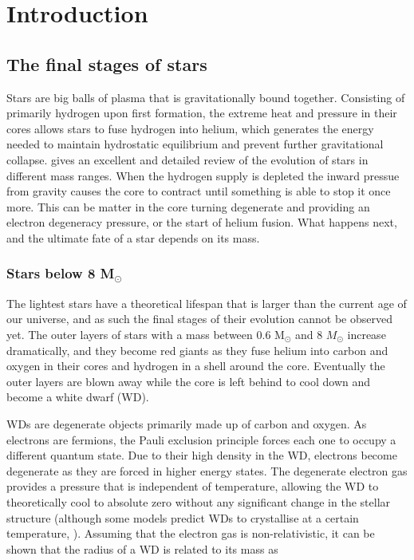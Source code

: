 \documentclass[a4paper,oneside,12pt, class=Latex/Classes/PhDthesisPSnPDF, crop=false]{standalone}
\begin{document}
\doublespacing
\chapter{Introduction}
\label{chap:intro}

\section{The final stages of stars}
Stars are big balls of plasma that is gravitationally bound together. Consisting of primarily hydrogen upon first formation, the extreme heat and pressure in their cores allows stars to fuse hydrogen into helium, which generates the energy needed to maintain hydrostatic equilibrium and prevent further gravitational collapse. \citet{starstruct} gives an excellent and detailed review of the evolution of stars in different mass ranges. When the hydrogen supply is depleted the inward pressue from gravity causes the core to contract until something is able to stop it once more. This can be matter in the core turning degenerate and providing an electron degeneracy pressure, or the start of helium fusion. What happens next, and the ultimate fate of a star depends on its mass.


\subsection{Stars below 8 M$_\odot$}
\label{interm_mass_stars}
The lightest stars have a theoretical lifespan that is larger than the current age of our universe, and as such the final stages of their evolution cannot be observed yet. The outer layers of stars with a mass between 0.6 M$_\odot$ and 8 $M_\odot$ increase dramatically, and they become red giants as they fuse helium into carbon and oxygen in their cores and hydrogen in a shell around the core. Eventually the outer layers are blown away while the core is left behind to cool down and become a white dwarf (WD).

WDs are degenerate objects primarily made up of carbon and oxygen. As electrons are fermions, the Pauli exclusion principle \citep{Pauli} forces each one to occupy a different quantum state. Due to their high density in the WD, electrons become degenerate as they are forced in higher energy states. The degenerate electron gas provides a pressure that is independent of temperature, allowing the WD to theoretically cool to absolute zero without any significant change in the stellar structure (although some models predict WDs to crystallise at a certain temperature, \citealt{WD_crystal_Mochkovitch, WD_crystal_Isern}). Assuming that the electron gas is non-relativistic, it can be shown that the radius of a WD is related to its mass as
\end{document}
